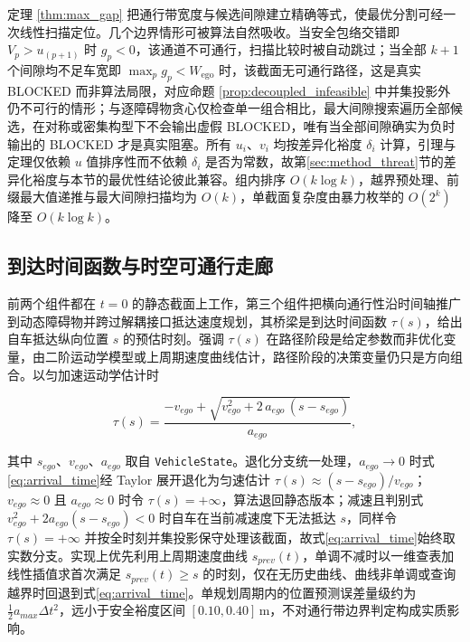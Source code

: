 \documentclass[a4paper,zihao=5]{ctexart}
\theoremstyle{definition}
\begin{document}
定理 \ref{thm:max_gap} 把通行带宽度与候选间隙建立精确等式，使最优分割可经一次线性扫描定位。几个边界情形可被算法自然吸收。当安全包络交错即 $V_p > u_{(p+1)}$ 时 $g_p < 0$，该通道不可通行，扫描比较时被自动跳过；当全部 $k+1$ 个间隙均不足车宽即 $\max_p g_p < W_{\text{ego}}$ 时，该截面无可通行路径，这是真实 BLOCKED 而非算法局限，对应命题 \ref{prop:decoupled_infeasible} 中并集投影外仍不可行的情形；与逐障碍物贪心仅检查单一组合相比，最大间隙搜索遍历全部候选，在对称或密集构型下不会输出虚假 BLOCKED，唯有当全部间隙确实为负时输出的 BLOCKED 才是真实阻塞。所有 $u_i$、$v_i$ 均按差异化裕度 $\delta_i$ 计算，引理与定理仅依赖 $u$ 值排序性而不依赖 $\delta_i$ 是否为常数，故第\ref{sec:method_threat}节的差异化裕度与本节的最优性结论彼此兼容。组内排序 $O(k\log k)$，越界预处理、前缀最大值递推与最大间隙扫描均为 $O(k)$，单截面复杂度由暴力枚举的 $O(2^k)$ 降至 $O(k\log k)$。

\subsection{到达时间函数与时空可通行走廊}
\label{sec:method_corridor}

前两个组件都在 $t=0$ 的静态截面上工作，第三个组件把横向通行性沿时间轴推广到动态障碍物并跨过解耦接口抵达速度规划，其桥梁是到达时间函数 $\tau(s)$，给出自车抵达纵向位置 $s$ 的预估时刻。强调 $\tau(s)$ 在路径阶段是给定参数而非优化变量，由二阶运动学模型或上周期速度曲线估计，路径阶段的决策变量仍只是方向组合。以匀加速运动学估计时

\begin{equation}
    \tau(s) = \frac{-v_{ego} + \sqrt{v_{ego}^{2} + 2\,a_{ego}\,(s - s_{ego})}}{a_{ego}},
    \label{eq:arrival_time}
\end{equation}

其中 $s_{ego}$、$v_{ego}$、$a_{ego}$ 取自 \texttt{VehicleState}。退化分支统一处理，$a_{ego}\to 0$ 时式\eqref{eq:arrival_time}经 Taylor 展开退化为匀速估计 $\tau(s)\approx (s-s_{ego})/v_{ego}$；$v_{ego}\approx 0$ 且 $a_{ego}\approx 0$ 时令 $\tau(s)=+\infty$，算法退回静态版本；减速且判别式 $v_{ego}^{2}+2a_{ego}(s-s_{ego})<0$ 时自车在当前减速度下无法抵达 $s$，同样令 $\tau(s)=+\infty$ 并按全时刻并集投影保守处理该截面，故式\eqref{eq:arrival_time}始终取实数分支。实现上优先利用上周期速度曲线 $s_{prev}(t)$，单调不减时以一维查表加线性插值求首次满足 $s_{prev}(t)\geq s$ 的时刻，仅在无历史曲线、曲线非单调或查询越界时回退到式\eqref{eq:arrival_time}。单规划周期内的位置预测误差量级约为 $\tfrac{1}{2}a_{max}\Delta t^{2}$，远小于安全裕度区间 $[0.10, 0.40]$\,m，不对通行带边界判定构成实质影响。
\end{document}
